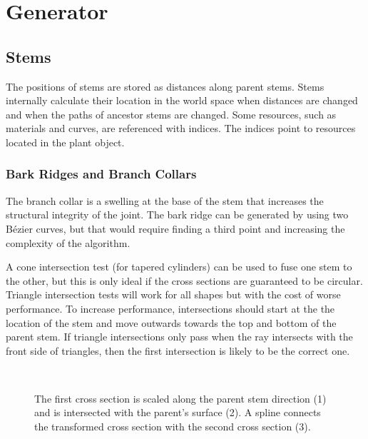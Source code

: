 \documentclass[10pt]{article}
\begin{document}
\section{Generator}

\subsection{Stems}

The positions of stems are stored as distances along parent stems. Stems internally calculate their location in the world space when distances are changed and when the paths of ancestor stems are changed. Some resources, such as materials and curves, are referenced with indices. The indices point to resources located in the plant object.

\subsubsection{Bark Ridges and Branch Collars}

\begin{minipage}[t]{0.46\textwidth}
The branch collar is a swelling at the base of the stem that increases the structural integrity of the joint. The bark ridge can be generated by using two B\'{e}zier curves, but that would require finding a third point and increasing the complexity of the algorithm.

\setlength{\parindent}{1.5em}
A cone intersection test (for tapered cylinders) can be used to fuse one stem to the other, but this is only ideal if the cross sections are guaranteed to be circular. Triangle intersection tests will work for all shapes but with the cost of worse performance. To increase performance, intersections should start at the the location of the stem and move outwards towards the top and bottom of the parent stem. If triangle intersections only pass when the ray intersects with the front side of triangles, then the first intersection is likely to be the correct one.

\end{minipage}
\hfill
\begin{minipage}[t]{0.46\textwidth}
 \begin{figure}[H]
  \centering
   \\
  \caption{The first cross section is scaled along the parent stem direction (1) and is intersected with the parent's surface (2). A spline connects the transformed cross section with the second cross section (3).}
 \end{figure}
\end{minipage}
\end{document}
